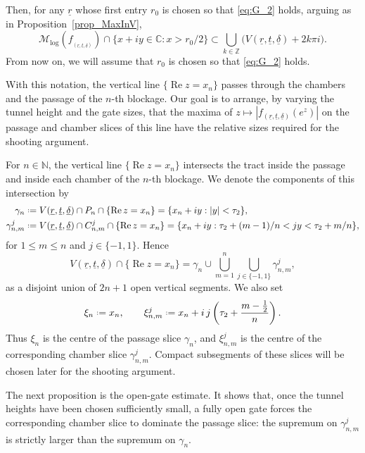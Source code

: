 \documentclass[a4paper, 11pt, reqno]{amsart}
\numberwithin{equation}{section}
\theoremstyle{plain}
\newcommand*{\defeq}{\mathrel{\vcenter{\baselineskip0.5ex \lineskiplimit0pt
 \hbox{\scriptsize.}\hbox{\scriptsize.}}}=}
\theoremstyle{remark}
\newcommand{\C}{{\mathbb{C}}}
\newcommand{\Z}{{\mathbb{Z}}}
\newcommand{\N}{{\mathbb{N}}}
\newcommand{\Mlog}{{\mathcal{M}_{\log}}}
\newcommand{\uldelta}{\underline{\delta}}
\newcommand{\ulr}{\underline{r}}
\newcommand{\ult}{\underline{t}}
\newcommand{\Rea}{\operatorname{Re }}
\begin{document}
Then, for any \(\ulr\) whose first entry \(r_0\) is chosen so that \eqref{eq:G_2} holds, arguing as in Proposition~\ref{prop_MaxInV}, 
\begin{equation}
	\Mlog(f_{_{(\ulr,\ult,\uldelta)}}) \cap \{x+iy\in\C:x>r_0/2\}
	\subset
	\bigcup_{k\in\Z}\bigl(V(\ulr,\ult,\uldelta)+2k\pi i\bigr).
\end{equation}
From now on, we will assume that \(r_0\) is chosen so that \eqref{eq:G_2} holds.

With this notation, the vertical line \(\{\Rea z=x_n\}\) passes through the chambers and the passage of the \(n\)-th blockage. Our goal is to arrange, by varying the tunnel height and the gate sizes, that the maxima of \(z\mapsto |f_{(\ulr,\ult,\uldelta)}(e^z)|\) on the passage and chamber slices of this line have the relative sizes required for the shooting argument.

For \(n\in\N\), the vertical line \(\{\Rea z=x_n\}\) intersects the tract
inside the passage and inside each chamber of the \(n\)-th blockage. We denote
the components of this intersection by
\begin{align*}
	\gamma_n
	&\defeq V(\ulr,\ult,\uldelta)\cap P_n\cap\{\Rea z=x_n\}
	= \{x_n+iy: |y|<\tau_2\},\\
	\gamma^j_{n,m}
	&\defeq V(\ulr,\ult,\uldelta)\cap C^j_{n,m}\cap\{\Rea z=x_n\}
	= \{x_n+iy: \tau_2+(m-1)/n<jy<\tau_2+m/n\},
\end{align*}
for \(1\le m\le n\) and \(j\in\{-1,1\}\). Hence
\[
V(\ulr,\ult,\uldelta)\cap\{\Rea z=x_n\}
=
\gamma_n\cup
\bigcup_{m=1}^n\bigcup_{j\in\{-1,1\}}\gamma^j_{n,m},
\]
as a disjoint union of \(2n+1\) open vertical segments. We also set
\[
\xi_n\defeq x_n,\qquad
\xi^j_{n,m}\defeq x_n+i\,j\left(\tau_2+\frac{m-\frac12}{n}\right).
\]
Thus \(\xi_n\) is the centre of the passage slice \(\gamma_n\), and
\(\xi^j_{n,m}\) is the centre of the corresponding chamber slice
\(\gamma^j_{n,m}\). Compact subsegments of these slices will be chosen later
for the shooting argument.

The next proposition is the open-gate estimate. It shows that, once the
tunnel heights have been chosen sufficiently small, a fully open gate forces
the corresponding chamber slice to dominate the passage slice: the supremum
on \(\gamma^j_{n,m}\) is strictly larger than the supremum on \(\gamma_n\).
\end{document}
